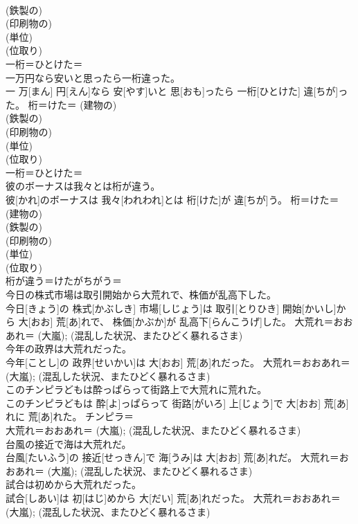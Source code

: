 \documentclass[8pt]{extreport}
\begin{document}
\begin{CJK}{UTF8}{min}
{\\	(鉄製の) 
\\	(印刷物の) 
\\	(単位) 
\\	(位取り) 
\\	一桁＝ひとけた＝ 
\\	一万円なら安いと思ったら一桁違った。	
\\	一 万[まん] 円[えん]なら 安[やす]いと 思[おも]ったら 一桁[ひとけた] 違[ちが]った。	桁＝けた＝ (建物の) 
\\	(鉄製の) 
\\	(印刷物の) 
\\	(単位) 
\\	(位取り) 
\\	一桁＝ひとけた＝ 
\\	彼のボーナスは我々とは桁が違う。	
\\	彼[かれ]のボーナスは 我々[われわれ]とは 桁[けた]が 違[ちが]う。	桁＝けた＝ (建物の) 
\\	(鉄製の) 
\\	(印刷物の) 
\\	(単位) 
\\	(位取り) 
\\	桁が違う＝けたがちがう＝ 
\\	今日の株式市場は取引開始から大荒れで、株価が乱高下した。	
\\	今日[きょう]の 株式[かぶしき] 市場[しじょう]は 取引[とりひき] 開始[かいし]から 大[おお] 荒[あ]れで、 株価[かぶか]が 乱高下[らんこうげ]した。	大荒れ＝おおあれ＝ (大嵐); (混乱した状況、またひどく暴れるさま) 
\\	今年の政界は大荒れだった。	
\\	今年[ことし]の 政界[せいかい]は 大[おお] 荒[あ]れだった。	大荒れ＝おおあれ＝ (大嵐); (混乱した状況、またひどく暴れるさま) 
\\	このチンピラどもは酔っぱらって街路上で大荒れに荒れた。	
\\	このチンピラどもは 酔[よ]っぱらって 街路[がいろ] 上[じょう]で 大[おお] 荒[あ]れに 荒[あ]れた。	チンピラ＝ 
\\	大荒れ＝おおあれ＝ (大嵐); (混乱した状況、またひどく暴れるさま) 
\\	台風の接近で海は大荒れだ。	
\\	台風[たいふう]の 接近[せっきん]で 海[うみ]は 大[おお] 荒[あ]れだ。	大荒れ＝おおあれ＝ (大嵐); (混乱した状況、またひどく暴れるさま) 
\\	試合は初めから大荒れだった。	
\\	試合[しあい]は 初[はじ]めから 大[だい] 荒[あ]れだった。	大荒れ＝おおあれ＝ (大嵐); (混乱した状況、またひどく暴れるさま) 
}
\end{CJK}
\end{document}
